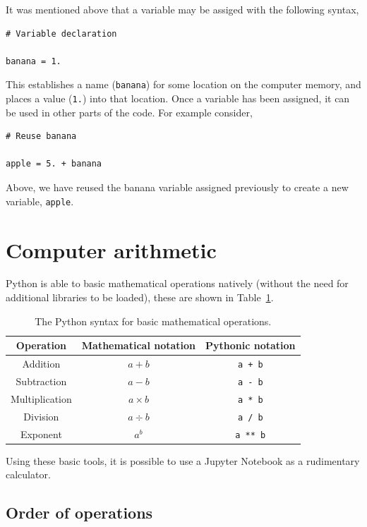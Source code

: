 \documentclass[a4paper]{article}
\begin{document}
It was mentioned above that a variable may be assiged with the following syntax,
\begin{lstlisting}
# Variable declaration

banana = 1.
\end{lstlisting}
This establishes a name (\texttt{banana}) for some location on the computer memory, and places a value (\texttt{1.}) into that location.
Once a variable has been assigned, it can be used in other parts of the code.
For example consider, 
\begin{lstlisting}
# Reuse banana

apple = 5. + banana
\end{lstlisting}
Above, we have reused the banana variable assigned previously to create a new variable, \texttt{apple}. 
\vspace{\baselineskip}
\begin{center}
	\noindent{}
\end{center}

\section{Computer arithmetic}

Python is able to basic mathematical operations natively (without the need for additional libraries to be loaded), these are shown in Table~\ref{tab:ops}.
\begin{table}[h]
	\centering
	\caption{The Python syntax for basic mathematical operations.}
	\label{tab:ops}
	\begin{tabular}{c c c}
		\hline
		Operation & Mathematical notation & Pythonic notation \\
		\hline
		Addition & $a + b$ & \texttt{a + b} \\
		Subtraction & $a - b$ & \texttt{a - b} \\
		Multiplication & $a \times b$ & \texttt{a * b} \\
		Division & $a \div b$ & \texttt{a / b} \\
		Exponent & $a^b$ & \texttt{a ** b} \\
		\hline
	\end{tabular}
\end{table}

Using these basic tools, it is possible to use a Jupyter Notebook as a rudimentary calculator. 

\subsection{Order of operations}




\end{document}
